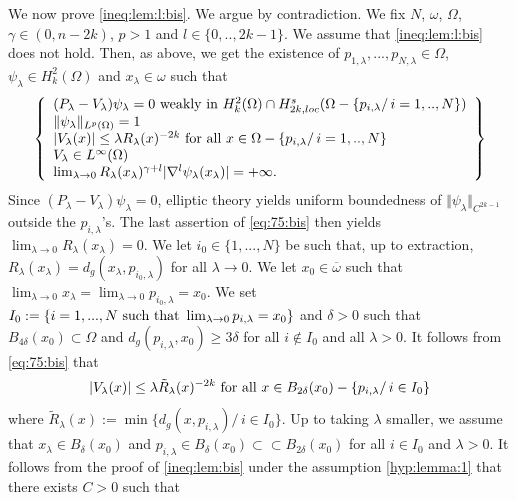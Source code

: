 \documentclass[reqno]{amsart}
\begin{document}
\medskip{} We   now     prove \eqref{ineq:lem:l:bis}. We argue by contradiction. We fix $N$, $\omega$, $\Omega$, $\gamma\in (0,n-2k)$, $p>1$ and $l\in \{0,..,2k-1\}$. We assume that \eqref{ineq:lem:l:bis} does not hold. Then, as above, we get the existence of   $p_{1,\lambda},...,p_{N,\lambda}\in \Omega$, $\psi_\lambda\in H_k^2(\Omega)$ and $x_\lambda\in \omega$ such that
\begin{equation}\label{eq:75:bis}
\left\{\begin{array}{l}
(P_\lambda-V_\lambda)\psi_\lambda=0 \hbox{ weakly in }H_k^2(\Omega)\cap H_{2k,loc}^s(\Omega-\{p_{i,\lambda}/\, i=1,..,N\})\\
\Vert\psi_\lambda\Vert_{L^p(\Omega)}=1\\
|V_{\lambda}(x)|\leq \lambda R_\lambda(x)^{-2k}\hbox{ for all }x\in \Omega-\{p_{i,\lambda}/\, i=1,..,N\}\\
V_{\lambda}\in L^\infty(\Omega)\\
\lim_{\lambda\to 0} R_\lambda(x_\lambda)^{\gamma+l}|\nabla^l\psi_\lambda(x_\lambda)|=+\infty.
\end{array}\right\}
\end{equation} 
Since $(P_\lambda-V_\lambda)\psi_\lambda=0$, elliptic theory yields uniform boundedness of $\Vert\psi_\lambda\Vert_{C^{2k-1}}$ outside the $p_{i,\lambda}$'s. The last assertion of \eqref{eq:75:bis} then yields $\lim_{\lambda\to 0}R_\lambda(x_\lambda)=0$. 
We let $i_0\in\{1,...,N\}$ be such that, up to extraction, $R_\lambda(x_\lambda)=d_g(x_\lambda, p_{i_0,\lambda})$ for all $\lambda\to 0$. We let $x_0\in \overline{\omega}$ such that $\lim_{\lambda\to 0}x_\lambda=\lim_{\lambda\to 0}p_{i_0,\lambda}=x_0$. We set $I_0:=\{i=1,...,N\hbox{ such that }\lim_{\lambda\to 0}p_{i,\lambda}=x_0\}$ and $\delta>0$ such that $B_{4\delta}(x_0)\subset \Omega$ and $d_g(p_{i,\lambda},x_0)\geq 3\delta$ for all $i\not\in I_0$ and all $\lambda>0$. It follows from \eqref{eq:75:bis} that
\begin{equation*}
|V_{\lambda}(x)|\leq \lambda \tilde{R}_\lambda(x)^{-2k}\hbox{ for all }x\in B_{2\delta}(x_0)-\{p_{i,\lambda}/\, i\in I_0\}
\end{equation*}
where $\tilde{R}_\lambda(x):=\min\{d_g(x, p_{i,\lambda})/\, i\in I_0\}$. Up to taking $\lambda$ smaller, we assume that $x_\lambda\in B_{\delta}(x_0)$ and $p_{i,\lambda}\in B_\delta(x_0)\subset\subset B_{2\delta}(x_0)$ for all $i\in I_0$ and $\lambda>0$. It  follows from the proof of \eqref{ineq:lem:bis} under the assumption \eqref{hyp:lemma:1} that there exists $C>0$ such that 
\end{document}
